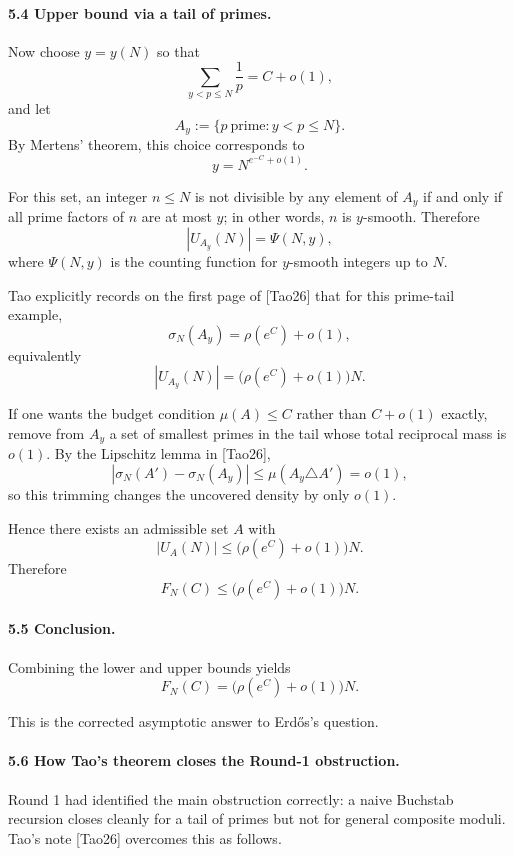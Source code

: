 \paragraph{5.4 Upper bound via a tail of primes.}

Now choose $y=y(N)$ so that
\[
\sum_{y<p\leq N}\frac1p = C+o(1),
\]
and let
\[
A_y:=\{p\ \mbox{prime}: y<p\leq N\}.
\]
By Mertens' theorem, this choice corresponds to
\[
y=N^{e^{-C}+o(1)}.
\]

For this set, an integer $n\leq N$ is not divisible by any element of $A_y$ if and only if all prime factors of $n$ are at most $y$; in other words, $n$ is $y$-smooth. Therefore
\[
|U_{A_y}(N)|=\Psi(N,y),
\]
where $\Psi(N,y)$ is the counting function for $y$-smooth integers up to $N$.

Tao explicitly records on the first page of [Tao26] that for this prime-tail example,
\[
\sigma_N(A_y)=\rho(e^C)+o(1),
\]
equivalently
\[
|U_{A_y}(N)|=\bigl(\rho(e^C)+o(1)\bigr)N.
\]

If one wants the budget condition $\mu(A)\leq C$ rather than $C+o(1)$ exactly, remove from $A_y$ a set of smallest primes in the tail whose total reciprocal mass is $o(1)$. By the Lipschitz lemma in [Tao26],
\[
|\sigma_N(A')-\sigma_N(A_y)|\leq \mu(A_y\triangle A')=o(1),
\]
so this trimming changes the uncovered density by only $o(1)$.

Hence there exists an admissible set $A$ with
\[
|U_A(N)|\leq \bigl(\rho(e^C)+o(1)\bigr)N.
\]
Therefore
\[
F_N(C)\leq \bigl(\rho(e^C)+o(1)\bigr)N.
\]

\paragraph{5.5 Conclusion.}

Combining the lower and upper bounds yields
\[
F_N(C)=\bigl(\rho(e^C)+o(1)\bigr)N.
\]

This is the corrected asymptotic answer to Erd\H{o}s's question.

\paragraph{5.6 How Tao's theorem closes the Round-1 obstruction.}

Round 1 had identified the main obstruction correctly: a naive Buchstab recursion closes cleanly for a tail of primes but not for general composite moduli. Tao's note [Tao26] overcomes this as follows.

